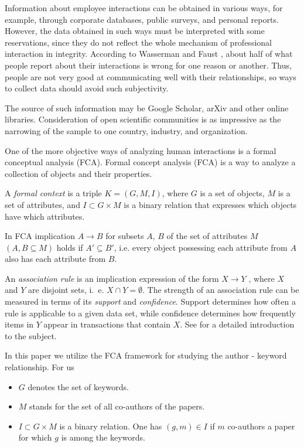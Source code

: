 \documentclass[12pt]{report}
\theoremstyle{definition}
\begin{document}
Information about employee interactions can be obtained in various ways, for example, through corporate databases, public surveys, and personal reports.
However, the data obtained in such ways must be interpreted with some reservations, since they do not reflect the whole mechanism of professional interaction in integrity.
According to Wasserman and Faust \cite{wasserman1994social}, about half of what people report about their interactions is wrong for one reason or another.
Thus, people are not very good at communicating well with their relationships, so ways to collect data should avoid such subjectivity.

The source of such information may be Google Scholar, arXiv and other online libraries.
Consideration of open scientific communities is as impressive as the narrowing of the sample to one country, industry, and organization.

One of the more objective ways of analyzing human interactions is a formal conceptual analysis (FCA).
Formal concept analysis (FCA) is a way to analyze a collection of objects and their properties. 

A {\em formal context} is a triple $K = (G, M, I)$, where $G$ is a set of objects, $M$ is a set of attributes, and $I \subset G \times M$ is a binary relation that expresses which objects have which attributes.

In FCA implication $A \to B$ for subsets $A$, $B$ of the set of attributes $M$ $(A,B \subseteq M )$ holds if $A' \subseteq B'$, i.e. every object possessing each attribute from $A$ also has each attribute from $B$.

An {\em  association rule} is an implication expression of the form $X \to Y$ , where $X$ and $Y$ are disjoint sets, i.~e. $X\cap Y = \emptyset$. The strength of an association rule can be measured in terms of its {\em support} and {\em confidence}. Support determines how often a rule is applicable to a given data set, while confidence determines how frequently items in $Y$ appear in transactions that contain $X$. See \cite{ganter2005formal} for a detailed introduction to the subject. 

In this paper we utilize the FCA framework for studying the author - keyword relationship. For us
\begin{itemize}
	\item $G$ denotes the set of keywords.
	\item $M$ stands for the set of all co-authors of the papers.
	\item $I \subset G \times M$ is a binary relation. One has $(g,m)\in I$ if $m$ co-authors a paper for which $g$ is among the keywords.
\end{itemize}
\end{document}
